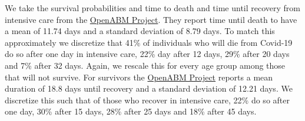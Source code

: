 We take the survival probabilities and time to death and time until recovery from
intensive care from the \href{https://tinyurl.com/y5owhyts}{OpenABM Project}. They report
time until death to have a mean of 11.74 days and a standard deviation of 8.79 days. To
match this approximately we discretize that 41\% of individuals who will die from
Covid-19 do so after one day in intensive care, 22\% day after 12 days, 29\% after 20
days and 7\% after 32 days. Again, we rescale this for every age group among those that
will not survive. For survivors the \href{https://tinyurl.com/y5owhyts}{OpenABM Project}
reports a mean duration of 18.8 days until recovery and a standard deviation of 12.21
days. We discretize this such that of those who recover in intensive care, 22\% do so
after one day, 30\% after 15 days, 28\% after 25 days and 18\% after 45 days.

\FloatBarrier

